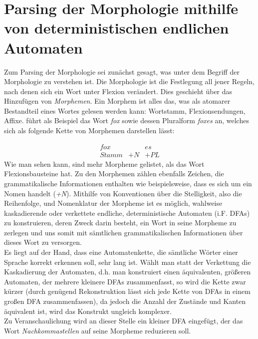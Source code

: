 \documentclass[12pt,twoside]{article}
\theoremstyle{plain}
\theoremstyle{definition}
\theoremstyle{remark}
\begin{document}
\section{Parsing der Morphologie mithilfe von deterministischen endlichen Automaten}
\label{sec:pars}
Zum Parsing der Morphologie sei zunächst gesagt, was unter dem Begriff der Morphologie zu verstehen ist.
Die Morphologie ist die Festlegung all jener Regeln, nach denen sich ein Wort unter Flexion verändert.
Dies geschieht über das Hinzufügen von \textit{Morphemen}.
Ein Morphem ist alles das, was als atomarer Bestandteil eines Wortes gelesen werden kann: Wortstamm, Flexionsendungen, Affixe.
\cite{Jur2009} führt als Beispiel das Wort \textit{fox} sowie dessen Pluralform \textit{foxes} an, welches sich als folgende Kette von Morphemen darstellen lässt:\\
{\begin{equation*}
\begin{array}{ccc}
	fox & & es	\\
	Stamm & +N & +PL
\end{array}
\end{equation*}
Wie man sehen kann, sind mehr Morpheme gelistet, als das Wort Flexionsbausteine hat.
Zu den Morphemen zählen ebenfalls Zeichen, die grammatikalische Informationen enthalten wie beispielsweise, dass es sich um ein Nomen handelt (\textit{+N}).
Mithilfe von Konventionen über die Stelligkeit, also die Reihenfolge, und Nomenklatur der Morpheme ist es möglich, wahlweise kaskadierende oder verkettete endliche, deterministische Automaten (i.F. DFAs) zu konstruieren, deren Zweck darin besteht, ein Wort in seine Morpheme zu zerlegen und uns somit mit sämtlichen grammatikalischen Informationen über dieses Wort zu versorgen.\\
Es liegt auf der Hand, dass eine Automatenkette, die sämtliche Wörter einer Sprache korrekt erkennen soll, sehr lang ist.
Wählt man statt der Verkettung die Kaskadierung der Automaten, d.h. man konstruiert einen äquivalenten, größeren Automaten, der mehrere kleinere DFAs zusammenfasst, so wird die Kette zwar kürzer (durch genügend Rekonstruktion lässt sich jede Kette von DFAs in einem großen DFA zusammenfassen), da jedoch die Anzahl der Zustände und Kanten äquivalent ist, wird das Konstrukt ungleich komplexer.\\
Zu Veranschaulichung wird an dieser Stelle ein kleiner DFA eingefügt, der das Wort \textit{Nachkommastellen} auf seine Morpheme reduzieren soll.\\
\begin{figure}[h]
\end{figure}}
\end{document}

